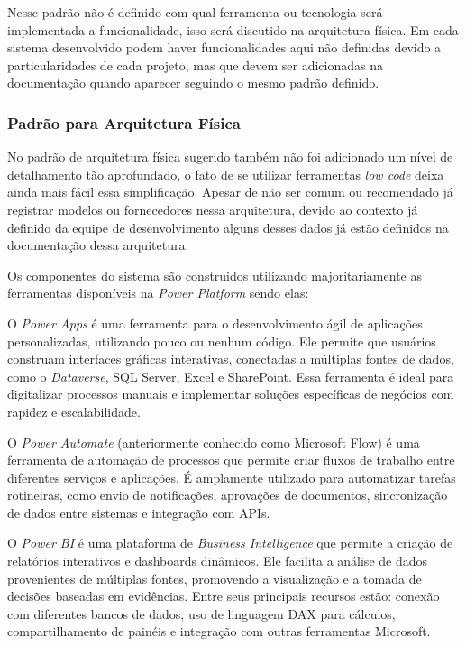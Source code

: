 	Nesse padrão não é definido com qual ferramenta ou tecnologia será implementada a funcionalidade, isso será discutido na arquitetura física. Em cada sistema desenvolvido podem haver funcionalidades
	aqui não definidas devido a particularidades de cada projeto, mas que devem ser adicionadas na documentação quando aparecer seguindo o mesmo padrão definido.

	\subsubsection{{\color{blue}Padrão para Arquitetura Física}}

	No padrão de arquitetura física sugerido também não foi adicionado um nível de detalhamento tão aprofundado, o fato de se utilizar ferramentas \textit{low code} deixa ainda mais fácil essa
	simplificação. Apesar de não ser comum ou recomendado já registrar modelos ou fornecedores nessa arquitetura, devido ao contexto já definido da equipe de desenvolvimento alguns desses dados
	já estão definidos na documentação dessa arquitetura.

	Os componentes do sistema são construidos utilizando majoritariamente as ferramentas disponíveis na \textit{Power Platform} sendo elas:

	O \textit{Power Apps} é uma ferramenta para o desenvolvimento ágil de aplicações personalizadas, utilizando pouco ou nenhum código. Ele permite que usuários construam interfaces gráficas
	interativas, conectadas a múltiplas fontes de dados, como o \textit{Dataverse}, SQL Server, Excel e SharePoint. Essa ferramenta é ideal para digitalizar processos manuais e implementar
	soluções específicas de negócios com rapidez e escalabilidade.

	O \textit{Power Automate} (anteriormente conhecido como Microsoft Flow) é uma ferramenta de automação de processos que permite criar fluxos de trabalho entre diferentes serviços e
	aplicações. É amplamente utilizado para automatizar tarefas rotineiras, como envio de notificações, aprovações de documentos, sincronização de dados entre sistemas e integração com APIs.

	O \textit{Power BI} é uma plataforma de \textit{Business Intelligence} que permite a criação de relatórios interativos e dashboards dinâmicos. Ele facilita a análise de dados provenientes
	de múltiplas fontes, promovendo a visualização e a tomada de decisões baseadas em evidências. Entre seus principais recursos estão: conexão com diferentes bancos de dados, uso de linguagem
	DAX para cálculos, compartilhamento de painéis e integração com outras ferramentas Microsoft.

